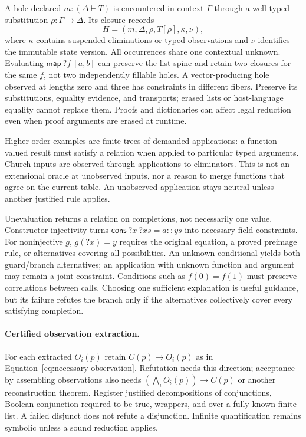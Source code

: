 A hole declared $m:(\Delta\vdash T)$ is encountered in context $\Gamma$ through
a well-typed substitution $\rho:\Gamma\to\Delta$. Its closure records
\[
 H=(m,\Delta,\rho,T[\rho],\kappa,\nu),
\]
where $\kappa$ contains suspended eliminations or typed observations and $\nu$
identifies the immutable state version. All occurrences share one contextual
unknown. Evaluating $\mathsf{map}\ ?f\ [a,b]$ can preserve the list spine and
retain two closures for the same $f$, not two independently fillable holes.
A vector-producing hole observed at lengths zero and three has constraints in
different fibers. Preserve its substitutions, equality evidence, and transports;
erased lists or host-language equality cannot replace them. Proofs and
dictionaries can affect legal reduction even when proof arguments are erased
at runtime.

Higher-order examples are finite trees of demanded applications: a
function-valued result must satisfy a relation when applied to particular
typed arguments. Church inputs are observed through applications to eliminators.
This is not an extensional oracle at unobserved inputs, nor a reason to merge
functions that agree on the current table. An unobserved application stays
neutral unless another justified rule applies.

Unevaluation returns a relation on completions, not necessarily one value.
Constructor injectivity turns $\mathsf{cons}\ ?x\ ?xs=a::ys$ into necessary
field constraints. For noninjective $g$, $g(?x)=y$ requires the original
equation, a proved preimage rule, or alternatives covering all possibilities.
An unknown conditional yields both guard/branch alternatives; an application
with unknown function and argument may remain a joint constraint. Conditions
such as $f(0)=f(1)$ must preserve correlations between calls. Choosing one
sufficient explanation is useful guidance, but its failure refutes the branch
only if the alternatives collectively cover every satisfying completion.

\paragraph{Certified observation extraction.}\label{sec:evaluation-observations}
For each extracted $O_i(p)$ retain $C(p)\to O_i(p)$ as in
Equation~\ref{eq:necessary-observation}. Refutation needs this direction;
acceptance by assembling observations also needs
$(\bigwedge_i O_i(p))\to C(p)$ or another reconstruction theorem.
Register justified decompositions of conjunctions, Boolean conjunction required
to be true,  wrappers, and  over a fully known finite
list. A failed disjunct does not refute a disjunction. Infinite quantification
remains symbolic unless a sound reduction applies.


